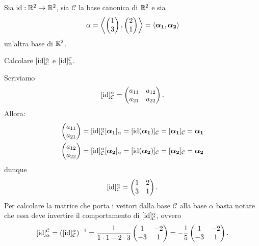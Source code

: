 \begin{example}
    Sia $\operatorname{id} : \mathbb{R}^2 \to \mathbb{R}^2$, sia $\mathcal{C}$ la base canonica di $\mathbb{R}^2$ e sia \[
        \alpha = \left\langle \begin{pmatrix} 1 \\ 3 \end{pmatrix}, \begin{pmatrix} 2 \\ 1 \end{pmatrix} \right\rangle = \left\langle \bm{\alpha_1}, \bm{\alpha_2} \right\rangle
    \] un'altra base di $\mathbb{R}^2$. 
    
    Calcolare $[\operatorname{id}]^{\alpha}_{\mathcal{C}}$ e $[\operatorname{id}]^{\mathcal{C}}_{\alpha}$.
\end{example}
\begin{solution} Scriviamo \[
        [\operatorname{id}]^{\alpha}_{\mathcal{C}} = \begin{pmatrix} a_{11} & a_{12} \\ a_{21} & a_{22} \end{pmatrix}.
    \] Allora:
    \begin{gather*}
        \begin{pmatrix} a_{11} \\ a_{21} \end{pmatrix} = [\operatorname{id}]^{\alpha}_{\mathcal{C}} [\bm{\alpha_1}]_{\alpha} = [\operatorname{id}(\bm{\alpha_1})]_{\mathcal{C}}= [\bm{\alpha_1}]_{\mathcal{C}} = \bm{\alpha_1}  \\
        \begin{pmatrix} a_{12} \\ a_{22} \end{pmatrix} = [\operatorname{id}]^{\alpha}_{\mathcal{C}} [\bm{\alpha_2}]_{\alpha} = [\operatorname{id}(\bm{\alpha_2})]_{\mathcal{C}}= [\bm{\alpha_2}]_{\mathcal{C}} = \bm{\alpha_2}
    \end{gather*}
    dunque \[
        [\operatorname{id}]^{\alpha}_{\mathcal{C}} = \begin{pmatrix} 1 & 2 \\ 3 & 1 \end{pmatrix}.
    \] Per calcolare la matrice che porta i vettori dalla base $\mathcal{C}$ alla base $\alpha$ basta notare che essa deve invertire il comportamento di $[\operatorname{id}]^{\alpha}_{\mathcal{C}}$, ovvero \[
        [\operatorname{id}]^{\mathcal{C}}_{\alpha} = ([\operatorname{id}]^{\alpha}_{\mathcal{C}})^{-1} = \frac{1}{1\cdot 1 - 2 \cdot 3} \begin{pmatrix} 1 & -2 \\ -3 & 1 \end{pmatrix} = -\frac{1}{5} \begin{pmatrix} 1 & -2 \\ -3 & 1 \end{pmatrix}.
    \]
\end{solution}

